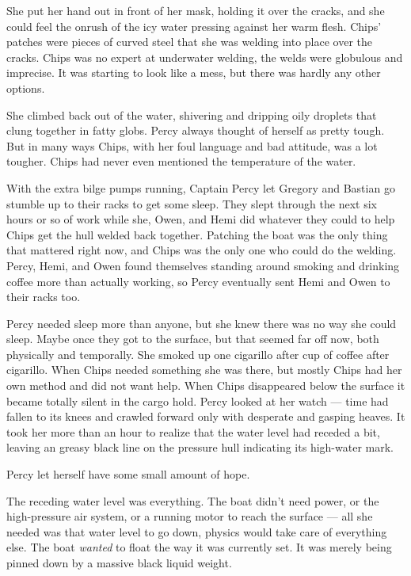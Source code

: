 \documentclass[]{article}
\begin{document}
\begin{multicols}{2}
She put her hand out in front of her mask, holding it over the cracks,
and she could feel the onrush of the icy water pressing against her warm
flesh. Chips' patches were pieces of curved steel that she was welding
into place over the cracks. Chips was no expert at underwater welding,
the welds were globulous and imprecise. It was starting to look like a
mess, but there was hardly any other options.

She climbed back out of the water, shivering and dripping oily droplets
that clung together in fatty globs. Percy always thought of herself as
pretty tough. But in many ways Chips, with her foul language and bad
attitude, was a lot tougher. Chips had never even mentioned the
temperature of the water.

With the extra bilge pumps running, Captain Percy let Gregory and
Bastian go stumble up to their racks to get some sleep. They slept
through the next six hours or so of work while she, Owen, and Hemi did
whatever they could to help Chips get the hull welded back together.
Patching the boat was the only thing that mattered right now, and Chips
was the only one who could do the welding. Percy, Hemi, and Owen found
themselves standing around smoking and drinking coffee more than
actually working, so Percy eventually sent Hemi and Owen to their racks
too.

Percy needed sleep more than anyone, but she knew there was no way she
could sleep. Maybe once they got to the surface, but that seemed far off
now, both physically and temporally. She smoked up one cigarillo after
cup of coffee after cigarillo. When Chips needed something she was
there, but mostly Chips had her own method and did not want help. When
Chips disappeared below the surface it became totally silent in the
cargo hold. Percy looked at her watch --- time had fallen to its knees
and crawled forward only with desperate and gasping heaves. It took her
more than an hour to realize that the water level had receded a bit,
leaving an greasy black line on the pressure hull indicating its
high-water mark.

Percy let herself have some small amount of hope.

The receding water level was everything. The boat didn't need power, or
the high-pressure air system, or a running motor to reach the surface
--- all she needed was that water level to go down, physics would take
care of everything else. The boat \emph{wanted} to float the way it was
currently set. It was merely being pinned down by a massive black liquid
weight.


\end{multicols}
\end{document}
